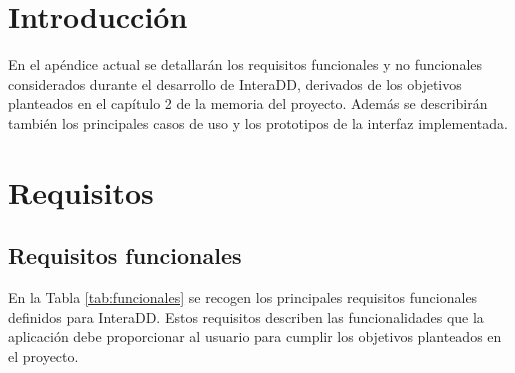 
\section{Introducción}
En el apéndice actual se detallarán los requisitos funcionales y no funcionales considerados durante el desarrollo de InteraDD, 
derivados de los objetivos planteados en el capítulo 2 de la memoria del proyecto. Además se describirán también los principales casos de uso y los 
prototipos de la interfaz implementada.

\section{Requisitos}
\subsection*{Requisitos funcionales}
En la Tabla \ref{tab:funcionales} se recogen los principales requisitos funcionales definidos para InteraDD. Estos requisitos describen las funcionalidades que la aplicación debe proporcionar al usuario para cumplir los objetivos planteados en el proyecto.
